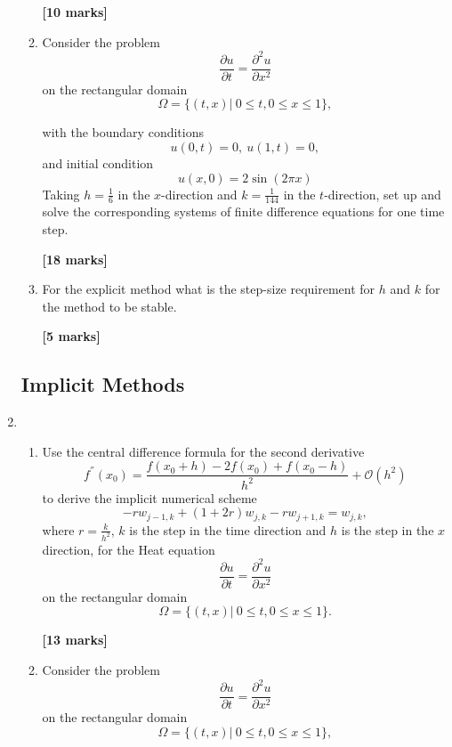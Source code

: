 \begin{enumerate}
\begin{enumerate}
\begin{flushright}
\textbf{[10 marks]}
\end{flushright}
	
	\item Consider the problem
	\[\frac{\partial u}{\partial t}=\frac{\partial^2 u}{\partial x^2} \]
	on the rectangular domain
	\[\Omega=\{(t,x)| \ 0\leq t, 0 \leq x \leq 1\}, \]

	with the boundary conditions
	\[ u(0,t)=0, \ u(1,t)=0,   \]
	and initial condition
	\[	u(x,0)=2\sin(2\pi x) \]
		Taking $h=\frac{1}{6}$ in the $x$-direction and $k=\frac{1}{144}$ in the $t$-direction, set up and solve the corresponding systems of finite difference equations for one time step.\\
\begin{flushright}
\textbf{[18 marks]}
\end{flushright}
	\item
	For the explicit method what is the step-size requirement for $h$ and $k$ for the method to be stable.
\begin{flushright}
\textbf{[5 marks]}
\end{flushright}
	
	
\end{enumerate}
\subsection{Implicit Methods}

	\item 
\begin{enumerate}
	
	\item 
	Use the central difference formula for the second derivative 
	\[ f^{''}(x_0)=\frac{f(x_0+h)-2f(x_0)+f(x_0-h)}{h^2}+\mathcal{O}(h^2)\]
	to derive the implicit numerical scheme
	\[-rw_{j-1,k}+(1+2r)w_{j,k}-rw_{j+1,k}=w_{j,k},\]
	where $r=\frac{k}{h^2}$, $k$ is the step in the time direction and $h$ is the step in the $x$ direction, 
	for the Heat equation 
	\[\frac{\partial u}{\partial t}=\frac{\partial^2 u}{\partial x^2} \]
	on the rectangular domain
		\[\Omega=\{(t,x)| \ 0\leq t, 0 \leq x \leq 1\}. \]

\begin{flushright}
\textbf{[13 marks]}
\end{flushright}
	
	\item Consider the problem
	\[\frac{\partial u}{\partial t}=\frac{\partial^2 u}{\partial x^2} \]
	on the rectangular domain
		\[\Omega=\{(t,x)| \ 0\leq t, 0 \leq x \leq 1\}, \]


\end{enumerate}
\end{enumerate}
